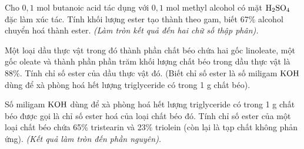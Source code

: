 \documentclass[12pt,a4paper]{article}
\begin{document}
\begin{ex}
Cho $0{,}1\text{ mol}$ butanoic acid tác dụng với $0{,}1\text{ mol}$ methyl alcohol có mặt $\ce{H2SO4}$ đặc làm xúc tác. Tính khối lượng ester tạo thành theo gam, biết 67\% alcohol chuyển hoá thành ester. \textit{(Làm tròn kết quả đến hai chữ số thập phân).}
\end{ex}

\begin{ex}
Một loại dầu thực vật trong đó thành phần chất béo chứa hai gốc linoleate, một gốc oleate và thành phần phần trăm khối lượng chất béo trong dầu thực vật là 88\%. Tính chỉ số ester của dầu thực vật đó. (Biết chỉ số ester là số miligam $\ce{KOH}$ dùng để xà phòng hoá hết lượng triglyceride có trong 1 g chất béo).
\end{ex}

\begin{ex}
Số miligam $\ce{KOH}$ dùng để xà phòng hoá hết lượng triglyceride có trong 1 g chất béo được gọi là chỉ số ester hoá của loại chất béo đó. Tính chỉ số ester của một loại chất béo chứa 65\% tristearin và 23\% triolein (còn lại là tạp chất không phản ứng). \textit{(Kết quả làm tròn đến phần nguyên).}
\end{ex}
\end{document}
